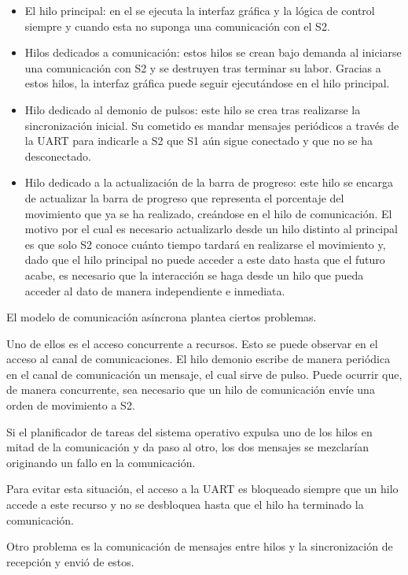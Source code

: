 \begin{itemize}
    \item El hilo principal: en el se ejecuta la interfaz gráfica y la lógica de control siempre y cuando esta no suponga una comunicación con el \ac{S2}.
    \item Hilos dedicados a comunicación: estos hilos se crean bajo demanda al iniciarse una comunicación con \ac{S2} y se destruyen tras terminar su labor. Gracias a estos hilos, la interfaz gráfica puede seguir ejecutándose en el hilo principal.
    \item Hilo dedicado al demonio de pulsos: este hilo se crea tras realizarse la sincronización inicial. Su cometido es mandar mensajes periódicos a través de la UART para indicarle a \ac{S2} que \ac{S1} aún sigue conectado y que no se ha desconectado.
    \item Hilo dedicado a la actualización de la barra de progreso: este hilo se encarga de actualizar la barra de progreso que representa el porcentaje del movimiento que ya se ha realizado, creándose en el hilo de comunicación. El motivo por el cual es necesario actualizarlo desde un hilo distinto al principal es que solo \ac{S2} conoce cuánto tiempo tardará en realizarse el movimiento y, dado que el hilo principal no puede acceder a este dato hasta que el futuro acabe, es necesario que la interacción se haga desde un hilo que pueda acceder al dato de manera independiente e inmediata.
\end{itemize}

El modelo de comunicación asíncrona plantea ciertos problemas.

Uno de ellos es el acceso concurrente a recursos. Esto se puede observar en el acceso al canal de comunicaciones. El hilo demonio escribe de manera periódica en el canal de comunicación un mensaje, el cual sirve de pulso. Puede ocurrir que, de manera concurrente, sea necesario que un hilo de comunicación envíe una orden de movimiento a \ac{S2}.

Si el planificador de tareas del sistema operativo expulsa uno de los hilos en mitad de la comunicación y da paso al otro, los dos mensajes se mezclarían originando un fallo en la comunicación. 

Para evitar esta situación, el acceso a la UART es bloqueado siempre que un hilo accede a este recurso y no se desbloquea hasta que el hilo ha terminado la comunicación.

Otro problema es la comunicación de mensajes entre hilos y la sincronización de recepción y envió de estos. 

